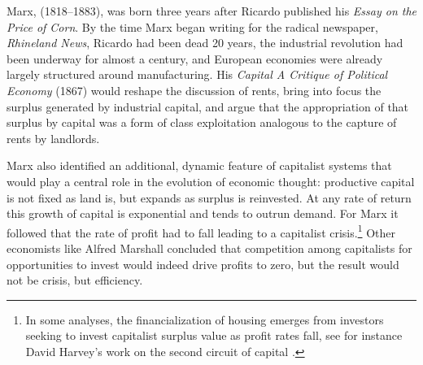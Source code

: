 Marx, (1818--1883), was born three years after Ricardo published his \textit{Essay on the Price of Corn}. By the time Marx began writing for the radical newspaper, \textit{Rhineland News}, Ricardo had been dead 20 years, the industrial revolution had been underway for almost a century, and European economies were already largely structured around manufacturing. His \emph{Capital A Critique of Political Economy} %
(1867) would reshape the discussion of rents, bring into focus the surplus generated by industrial capital, and argue that the appropriation of that surplus by capital was a form of class exploitation analogous to the capture of rents by landlords.

Marx also identified an additional, dynamic feature of capitalist systems that would play a central role in the evolution of economic thought: productive capital is not fixed as land is, but expands as surplus is reinvested. At any rate of return this growth of capital is exponential and tends to outrun demand. %
For Marx it followed that  the rate of profit had to fall leading to a capitalist crisis.\footnote{In some analyses, the financialization of housing emerges from investors seeking to invest capitalist surplus value as profit rates fall, see for instance David Harvey's work on \gls{the second circuit of capital} \cite{GET_david_harvey}.} Other economists like Alfred Marshall concluded that competition among capitalists for opportunities to invest would indeed drive profits to zero, but the result would not be crisis, but efficiency.




